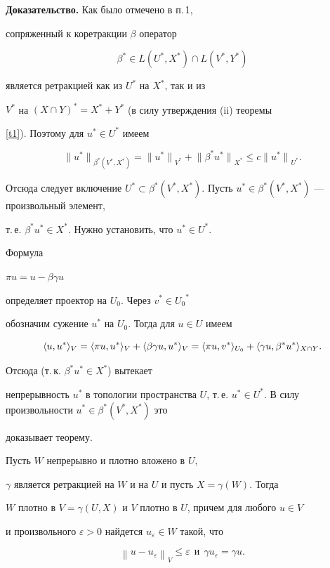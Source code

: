 {\bf Доказательство.} Как было отмечено в п.\,1,


сопряженный к коретракции $\beta$ оператор


$$


\beta^* \in L(U^*, X^*) \cap L(V^*, Y^*)


$$


является ретракцией как из $U^*$ на $X^*$, так и из


$V^*$ на $(X \cap Y)^*=X^*+Y^*$ (в силу утверждения (ii) теоремы


\ref{t1}). Поэтому для $u^* \in U^*$ имеем


$$


{\|u^*\|}_{\beta ^*(V^*,X^*)} =


{\|u^*\|}_{V^*}+{\|\beta^*u^*\|}_{X^*} \leq c{\|u^*\|}_{U^*}.


$$


Отсюда следует включение $U^* \subset \beta^*(V^*,


X^*)$. Пусть $u^* \in \beta^*(V^*, X^*)$ --- произвольный элемент,


т.\,е. $\beta^* u^* \in X^*$. Нужно установить, что $u^* \in U^*$.


Формула


$\pi u=u - \beta\gamma u$


определяет проектор на $U_0$. Через $v^* \in {U_0}^*$


обозначим сужение $u^*$ на $U_0$. Тогда для $u \in U$ имеем


$$


\la u, u^*\ra _V=\la \pi u, u^*\ra _V+\la \beta\gamma u, u^*\ra _V=


\la \pi u, v^*\ra _{U_0}+\la \gamma u, \beta^* u^*\ra _{X \cap Y}.


$$


Отсюда (т.\,к. $\beta^* u^* \in X^*$) вытекает


непрерывность $u^*$ в топологии пространства $U$, т.\,е. $u^* \in


U^*$. В силу произвольности $u^* \in \beta^*(V^*, X^*)$ это


доказывает теорему.





\begin{thms} \label{tdens}


Пусть $W$ непрерывно и плотно вложено в $U$,


$\gamma$ является ретракцией на $W$ и на $U$ и пусть $X=\gamma(W)$. Тогда


$W$ плотно в $V=\gamma(U,X)$ и $V$ плотно в $U$, причем для любого $u \in V$


и произвольного $\varepsilon > 0$ найдется $u_\varepsilon \in W$ такой, что


$$


{\left\| {u-u_\varepsilon } \right\|}_{V}


\le \varepsilon \ \ \text{и} \ \ \gamma u_\varepsilon=\gamma u.


$$


\end{thms}





